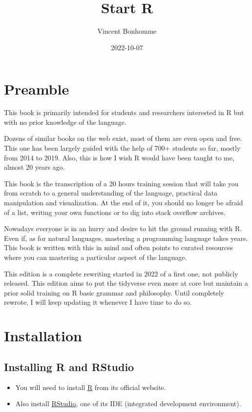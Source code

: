 \documentclass[
]{book}
\title{Start R}
\author{Vincent Bonhomme}
\date{2022-10-07}
\providecommand{\tightlist}{%
  \setlength{\itemsep}{0pt}\setlength{\parskip}{0pt}}
\begin{document}
\maketitle

{
\setcounter{tocdepth}{1}
\tableofcontents
}
\hypertarget{preamble}{%
\chapter{Preamble}\label{preamble}}

This book is primarily intended for students and researchers interested in R but with no prior knowledge of the language.

Dozens of similar books on the web exist, most of them are even open and free. This one has been largely guided with the help of 700+ students so far, mostly from 2014 to 2019. Also, this is how I wish R would have been taught to me, almost 20 years ago.

This book is the transcription of a 20 hours training session that will take you from scratch to a general understanding of the language, practical data manipulation and visualization. At the end of it, you should no longer be afraid of a list, writing your own functions or to dig into stack overflow archives.

Nowadays everyone is in an hurry and desire to hit the ground running with R. Even if, as for natural languages, mastering a programming language takes years. This book is written with this in mind and often points to curated resources where you can mastering a particular aspect of the language.

This edition is a complete rewriting started in 2022 of a first one, not publicly released. This edition aims to put the tidyverse even more at core but maintain a prior solid training on R basic grammar and philosophy. Until completely rewrote, I will keep updating it whenever I have time to do so.

\hypertarget{installation}{%
\chapter{Installation}\label{installation}}

\hypertarget{installing-r-and-rstudio}{%
\section{Installing R and RStudio}\label{installing-r-and-rstudio}}

\begin{itemize}
\tightlist
\item
  You will need to install \href{https://cran.r-project.org/}{R} from its official website.
\item
  Also install \href{https://www.rstudio.com/}{RStudio}, one of its IDE (integrated development environment).
\end{itemize}
\end{document}
